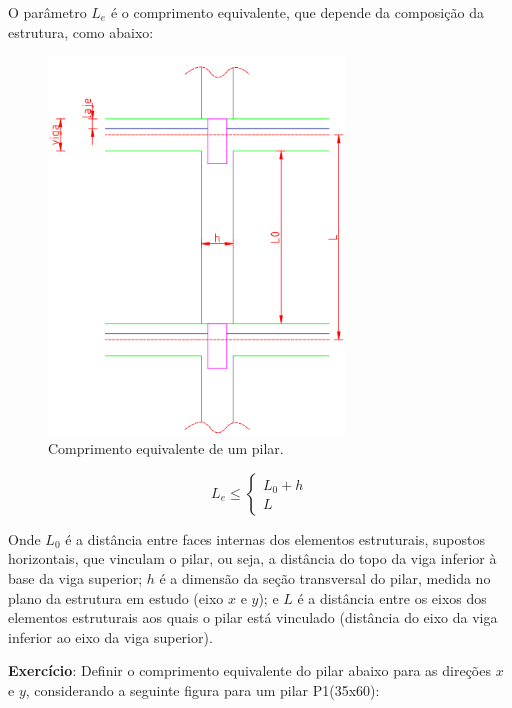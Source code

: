 O parâmetro $L_e$ é o comprimento equivalente, que depende da composição da estrutura, como abaixo:

\begin{figure}[H]
	\begin{center}
	\caption{Comprimento equivalente de um pilar.}
    	\includegraphics[width=0.7\textwidth]{Comprimento-equivalente/Imagens/Comprimento-equivalente.png}
	\end{center}
\end{figure}

\begin{equation}
	\label{equacao-comprimento-equivalente}
	L_e\leqslant\left\{
		\begin{array}{ll}
		L_0+h \\
		L
		\end{array}\right.
\end{equation}

Onde $L_0$ é a distância entre faces internas dos elementos estruturais, supostos horizontais, que vinculam o pilar, ou seja, a distância do topo da viga inferior à base da viga superior; $h$ é a dimensão da seção transversal do pilar, medida no plano da estrutura em estudo (eixo $x$ e $y$); e $L$ é a distância entre os eixos dos elementos estruturais aos quais o pilar está vinculado (distância do eixo da viga inferior ao eixo da viga superior).

\textbf{Exercício}: Definir o comprimento equivalente do pilar abaixo para as direções $x$ e $y$, considerando a seguinte figura para um pilar P1(35x60):

